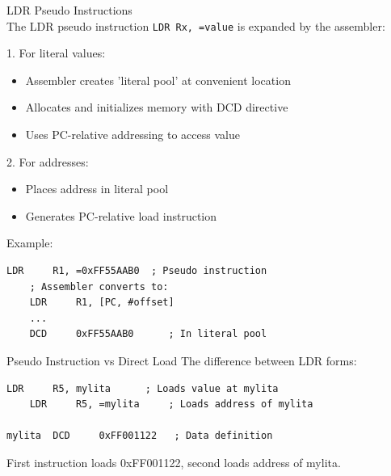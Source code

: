 \begin{definition}{LDR Pseudo Instructions}\\
The LDR pseudo instruction \texttt{LDR Rx, =value} is expanded by the assembler:

1. For literal values:
\begin{itemize}
  \item Assembler creates 'literal pool' at convenient location
  \item Allocates and initializes memory with DCD directive
  \item Uses PC-relative addressing to access value
\end{itemize}

2. For addresses:
\begin{itemize}
  \item Places address in literal pool
  \item Generates PC-relative load instruction
\end{itemize}

Example:
\begin{lstlisting}[language=armasm, style=basesmol]
    LDR     R1, =0xFF55AAB0  ; Pseudo instruction
    ; Assembler converts to:
    LDR     R1, [PC, #offset]
    ...
    DCD     0xFF55AAB0      ; In literal pool
\end{lstlisting}
\end{definition}

\begin{example2}{Pseudo Instruction vs Direct Load}
The difference between LDR forms:
\begin{lstlisting}[language=armasm, style=basesmol]
    LDR     R5, mylita      ; Loads value at mylita
    LDR     R5, =mylita     ; Loads address of mylita

mylita  DCD     0xFF001122   ; Data definition
\end{lstlisting}

First instruction loads 0xFF001122, second loads address of mylita.
\end{example2}